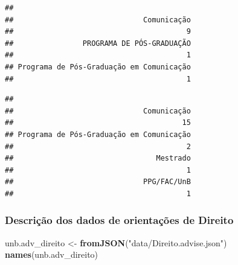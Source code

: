 \documentclass[]{article}
\newenvironment{Shaded}{\begin{snugshade}}{\end{snugshade}}
\newcommand{\KeywordTok}[1]{\textcolor[rgb]{0.13,0.29,0.53}{\textbf{#1}}}
\newcommand{\DataTypeTok}[1]{\textcolor[rgb]{0.13,0.29,0.53}{#1}}
\newcommand{\DecValTok}[1]{\textcolor[rgb]{0.00,0.00,0.81}{#1}}
\newcommand{\StringTok}[1]{\textcolor[rgb]{0.31,0.60,0.02}{#1}}
\newcommand{\OtherTok}[1]{\textcolor[rgb]{0.56,0.35,0.01}{#1}}
\newcommand{\OperatorTok}[1]{\textcolor[rgb]{0.81,0.36,0.00}{\textbf{#1}}}
\newcommand{\NormalTok}[1]{#1}
\begin{document}
\begin{Shaded}
\end{Shaded}

\begin{verbatim}
## 
##                              Comunicação 
##                                        9 
##                PROGRAMA DE PÓS-GRADUAÇÃO 
##                                        1 
## Programa de Pós-Graduação em Comunicação 
##                                        1
\end{verbatim}

\begin{Shaded}
\end{Shaded}

\begin{verbatim}
## 
##                              Comunicação 
##                                       15 
## Programa de Pós-Graduação em Comunicação 
##                                        2 
##                                 Mestrado 
##                                        1 
##                              PPG/FAC/UnB 
##                                        1
\end{verbatim}

\subsubsection{Descrição dos dados de orientações de
Direito}\label{descricao-dos-dados-de-orientacoes-de-direito}

\begin{Shaded}
\begin{Highlighting}[]
\NormalTok{unb.adv_direito <-}\StringTok{ }\KeywordTok{fromJSON}\NormalTok{(}\StringTok{"data/Direito.advise.json"}\NormalTok{)}
\KeywordTok{names}\NormalTok{(unb.adv_direito)}
\end{Highlighting}
\end{Shaded}
\end{document}
